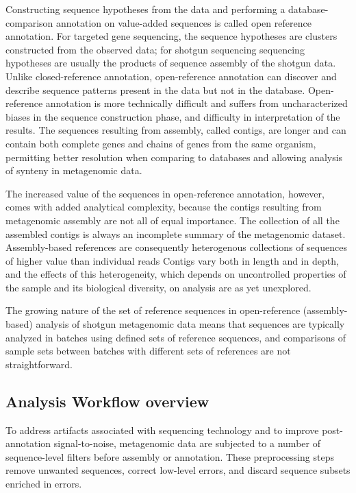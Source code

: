 \documentclass[graybox]{svmult}
\begin{document}

Constructing sequence hypotheses from the data and performing a database-comparison annotation on value-added sequences is called open reference annotation.   For targeted gene sequencing, the sequence hypotheses are clusters constructed from the observed data; for shotgun sequencing sequencing hypotheses are usually the products of sequence assembly of the shotgun data.   Unlike closed-reference annotation, open-reference annotation can discover and describe sequence patterns present in the data but not in the database.  Open-reference annotation is more technically difficult and suffers from uncharacterized biases in the sequence construction phase, and difficulty in interpretation of the results.  The sequences resulting from assembly, called contigs, are longer and can contain both complete genes and chains of genes from the same organism, permitting better resolution when comparing to databases and allowing analysis of synteny in metagenomic data.

The increased value of the sequences in open-reference annotation, however, comes with added analytical complexity, because the contigs resulting from metagenomic assembly are not all of equal importance.
The collection of all the assembled contigs is always an incomplete summary of the metagenomic dataset.
Assembly-based references are consequently heterogenous collections of sequences of higher value than individual reads
Contigs vary both in length and in depth, and the effects of this heterogeneity, which depends on uncontrolled properties of the sample and its biological diversity, on analysis are as yet unexplored.

The growing nature of the set of reference sequences in open-reference (assembly-based) analysis of shotgun metagenomic data means that sequences are typically analyzed in batches using defined sets of reference sequences, and comparisons of sample sets between batches with different sets of references are not straightforward.

\subsection{Analysis Workflow overview}
        To address artifacts associated with sequencing technology and to improve post-annotation signal-to-noise, metagenomic data are subjected to a number of sequence-level filters before assembly or annotation.  These preprocessing steps remove unwanted sequences, correct low-level errors, and discard sequence subsets enriched in errors.
\end{document}
